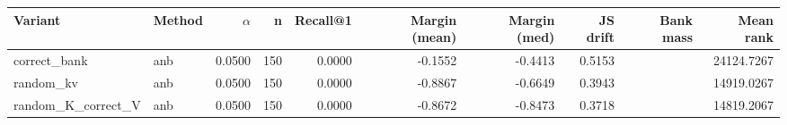 \begin{tabular}{l l r r r r r r r r}
\toprule
Variant & Method & $\alpha$ & n & Recall@1 & Margin (mean) & Margin (med) & JS drift & Bank mass & Mean rank \\
\midrule
correct\_bank & anb & 0.0500 & 150 & 0.0000 & -0.1552 & -0.4413 & 0.5153 &  & 24124.7267 \\
random\_kv & anb & 0.0500 & 150 & 0.0000 & -0.8867 & -0.6649 & 0.3943 &  & 14919.0267 \\
random\_K\_correct\_V & anb & 0.0500 & 150 & 0.0000 & -0.8672 & -0.8473 & 0.3718 &  & 14819.2067 \\
\bottomrule
\end{tabular}
